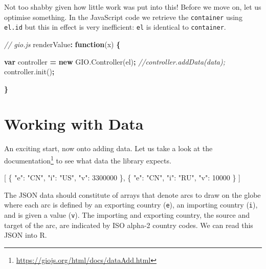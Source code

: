 \documentclass[
]{krantz}
\makeatletter
\newenvironment{Shaded}{\begin{snugshade}}{\end{snugshade}}
\newcommand{\AttributeTok}[1]{\textcolor[rgb]{0.61,0.61,0.61}{#1}}
\newcommand{\CommentTok}[1]{\textcolor[rgb]{0.37,0.37,0.37}{\textit{#1}}}
\newcommand{\DataTypeTok}[1]{\textcolor[rgb]{0.27,0.27,0.27}{#1}}
\newcommand{\DecValTok}[1]{\textcolor[rgb]{0.06,0.06,0.06}{#1}}
\newcommand{\FunctionTok}[1]{\textcolor[rgb]{0,0,0}{#1}}
\newcommand{\KeywordTok}[1]{\textcolor[rgb]{0.27,0.27,0.27}{\textbf{#1}}}
\newcommand{\NormalTok}[1]{#1}
\newcommand{\OperatorTok}[1]{\textcolor[rgb]{0.43,0.43,0.43}{\textbf{#1}}}
\newcommand{\OtherTok}[1]{\textcolor[rgb]{0.37,0.37,0.37}{#1}}
\newcommand{\StringTok}[1]{\textcolor[rgb]{0.5,0.5,0.5}{#1}}
\newcommand{\VariableTok}[1]{\textcolor[rgb]{0,0,0}{#1}}
\renewcommand{\href}[2]{#2\footnote{\url{#1}}}
\newenvironment{kframe}{%
\medskip{}
\setlength{\fboxsep}{.8em}
 \def\at@end@of@kframe{}%
 \ifinner\ifhmode%
  \def\at@end@of@kframe{\end{minipage}}%
  \begin{minipage}{\columnwidth}%
 \fi\fi%
 \def\FrameCommand##1{\hskip\@totalleftmargin \hskip-\fboxsep
 \colorbox{shadecolor}{##1}\hskip-\fboxsep
     \hskip-\linewidth \hskip-\@totalleftmargin \hskip\columnwidth}%
 \MakeFramed {\advance\hsize-\width
   \@totalleftmargin\z@ \linewidth\hsize
   \@setminipage}}%
 {\par\unskip\endMakeFramed%
 \at@end@of@kframe}
\renewenvironment{Shaded}{\begin{kframe}}{\end{kframe}}
\makeatother
\begin{document}
Not too shabby given how little work was put into this! Before we move on, let us optimise something. In the JavaScript code we retrieve the \texttt{container} using \texttt{el.id} but this in effect is very inefficient: \texttt{el} is identical to \texttt{container}.

\begin{Shaded}
\begin{Highlighting}[]
\CommentTok{// gio.js}
\NormalTok{renderValue}\OperatorTok{:} \KeywordTok{function}\NormalTok{(x) }\OperatorTok{\{}

  \KeywordTok{var}\NormalTok{ controller }\OperatorTok{=} \KeywordTok{new} \VariableTok{GIO}\NormalTok{.}\AttributeTok{Controller}\NormalTok{(el)}\OperatorTok{;}
  \CommentTok{//controller.addData(data);}
  \VariableTok{controller}\NormalTok{.}\AttributeTok{init}\NormalTok{()}\OperatorTok{;}

\OperatorTok{\}}
\end{Highlighting}
\end{Shaded}

\hypertarget{widgets-full-data}{%
\section{Working with Data}\label{widgets-full-data}}

An exciting start, now onto adding data. Let us take a look at the \href{https://giojs.org/html/docs/dataAdd.html}{documentation} to see what data the library expects.

\begin{Shaded}
\begin{Highlighting}[]
\OtherTok{[}
  \FunctionTok{\{}
    \DataTypeTok{"e"}\FunctionTok{:} \StringTok{"CN"}\FunctionTok{,}
    \DataTypeTok{"i"}\FunctionTok{:} \StringTok{"US"}\FunctionTok{,}
    \DataTypeTok{"v"}\FunctionTok{:} \DecValTok{3300000}
  \FunctionTok{\}}\OtherTok{,}
  \FunctionTok{\{}
    \DataTypeTok{"e"}\FunctionTok{:} \StringTok{"CN"}\FunctionTok{,}
    \DataTypeTok{"i"}\FunctionTok{:} \StringTok{"RU"}\FunctionTok{,}
    \DataTypeTok{"v"}\FunctionTok{:} \DecValTok{10000}
  \FunctionTok{\}}
\OtherTok{]}
\end{Highlighting}
\end{Shaded}

The JSON data should constitute of arrays that denote arcs to draw on the globe where each arc is defined by an exporting country (\texttt{e}), an importing country (\texttt{i}), and is given a value (\texttt{v}). The importing and exporting country, the source and target of the arc, are indicated by ISO alpha-2 country codes. We can read this JSON into R.
\end{document}
